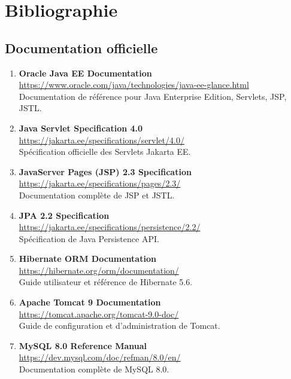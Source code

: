 \documentclass[12pt,a4paper]{report}
\begin{document}
\chapter*{Bibliographie}

\section*{Documentation officielle}

\begin{enumerate}
    \item \textbf{Oracle Java EE Documentation} \\
    \url{https://www.oracle.com/java/technologies/java-ee-glance.html} \\
    Documentation de référence pour Java Enterprise Edition, Servlets, JSP, JSTL.
    
    \item \textbf{Java Servlet Specification 4.0} \\
    \url{https://jakarta.ee/specifications/servlet/4.0/} \\
    Spécification officielle des Servlets Jakarta EE.
    
    \item \textbf{JavaServer Pages (JSP) 2.3 Specification} \\
    \url{https://jakarta.ee/specifications/pages/2.3/} \\
    Documentation complète de JSP et JSTL.
    
    \item \textbf{JPA 2.2 Specification} \\
    \url{https://jakarta.ee/specifications/persistence/2.2/} \\
    Spécification de Java Persistence API.
    
    \item \textbf{Hibernate ORM Documentation} \\
    \url{https://hibernate.org/orm/documentation/} \\
    Guide utilisateur et référence de Hibernate 5.6.
    
    \item \textbf{Apache Tomcat 9 Documentation} \\
    \url{https://tomcat.apache.org/tomcat-9.0-doc/} \\
    Guide de configuration et d'administration de Tomcat.
    
    \item \textbf{MySQL 8.0 Reference Manual} \\
    \url{https://dev.mysql.com/doc/refman/8.0/en/} \\
    Documentation complète de MySQL 8.0.
    

\end{enumerate}
\end{document}
